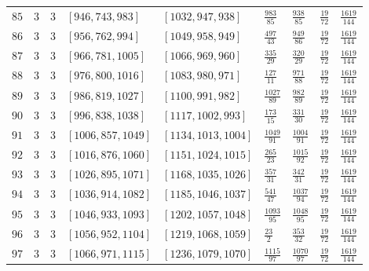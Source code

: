 \documentclass[12pt]{extarticle}
\begin{document}
\begin{longtable}{lllllllll}
$85$ & $3$ & $3$ & $\left[946, 743, 983\right]$ & $\left[1032, 947, 938\right]$ & $\frac{983}{85}$ & $\frac{938}{85}$ & $\frac{19}{72}$ & $\frac{1619}{144}$ \\
$86$ & $3$ & $3$ & $\left[956, 762, 994\right]$ & $\left[1049, 958, 949\right]$ & $\frac{497}{43}$ & $\frac{949}{86}$ & $\frac{19}{72}$ & $\frac{1619}{144}$ \\
$87$ & $3$ & $3$ & $\left[966, 781, 1005\right]$ & $\left[1066, 969, 960\right]$ & $\frac{335}{29}$ & $\frac{320}{29}$ & $\frac{19}{72}$ & $\frac{1619}{144}$ \\
$88$ & $3$ & $3$ & $\left[976, 800, 1016\right]$ & $\left[1083, 980, 971\right]$ & $\frac{127}{11}$ & $\frac{971}{88}$ & $\frac{19}{72}$ & $\frac{1619}{144}$ \\
$89$ & $3$ & $3$ & $\left[986, 819, 1027\right]$ & $\left[1100, 991, 982\right]$ & $\frac{1027}{89}$ & $\frac{982}{89}$ & $\frac{19}{72}$ & $\frac{1619}{144}$ \\
$90$ & $3$ & $3$ & $\left[996, 838, 1038\right]$ & $\left[1117, 1002, 993\right]$ & $\frac{173}{15}$ & $\frac{331}{30}$ & $\frac{19}{72}$ & $\frac{1619}{144}$ \\
$91$ & $3$ & $3$ & $\left[1006, 857, 1049\right]$ & $\left[1134, 1013, 1004\right]$ & $\frac{1049}{91}$ & $\frac{1004}{91}$ & $\frac{19}{72}$ & $\frac{1619}{144}$ \\
$92$ & $3$ & $3$ & $\left[1016, 876, 1060\right]$ & $\left[1151, 1024, 1015\right]$ & $\frac{265}{23}$ & $\frac{1015}{92}$ & $\frac{19}{72}$ & $\frac{1619}{144}$ \\
$93$ & $3$ & $3$ & $\left[1026, 895, 1071\right]$ & $\left[1168, 1035, 1026\right]$ & $\frac{357}{31}$ & $\frac{342}{31}$ & $\frac{19}{72}$ & $\frac{1619}{144}$ \\
$94$ & $3$ & $3$ & $\left[1036, 914, 1082\right]$ & $\left[1185, 1046, 1037\right]$ & $\frac{541}{47}$ & $\frac{1037}{94}$ & $\frac{19}{72}$ & $\frac{1619}{144}$ \\
$95$ & $3$ & $3$ & $\left[1046, 933, 1093\right]$ & $\left[1202, 1057, 1048\right]$ & $\frac{1093}{95}$ & $\frac{1048}{95}$ & $\frac{19}{72}$ & $\frac{1619}{144}$ \\
$96$ & $3$ & $3$ & $\left[1056, 952, 1104\right]$ & $\left[1219, 1068, 1059\right]$ & $\frac{23}{2}$ & $\frac{353}{32}$ & $\frac{19}{72}$ & $\frac{1619}{144}$ \\
$97$ & $3$ & $3$ & $\left[1066, 971, 1115\right]$ & $\left[1236, 1079, 1070\right]$ & $\frac{1115}{97}$ & $\frac{1070}{97}$ & $\frac{19}{72}$ & $\frac{1619}{144}$ \\

\end{longtable}
\end{document}
